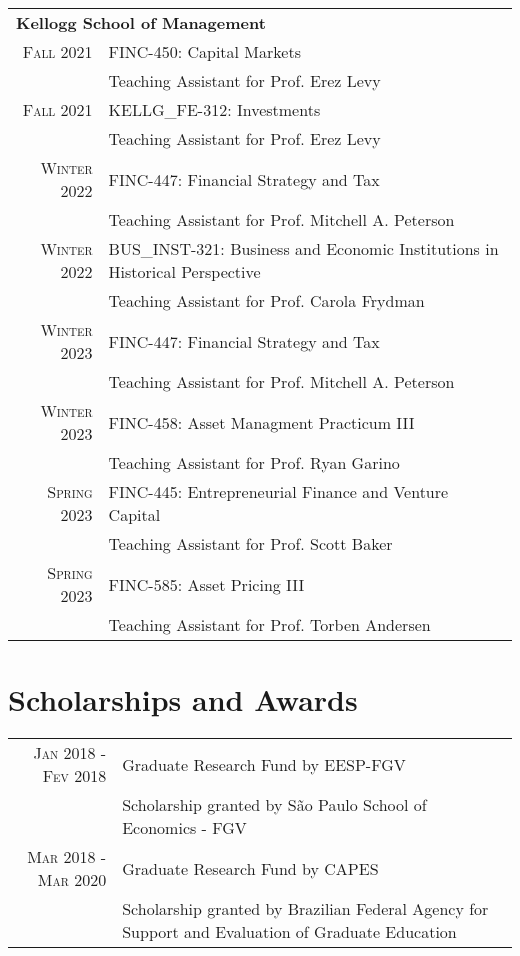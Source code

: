 \documentclass[a4paper,10pt]{article}
\begin{document}
\begin{tabular}{r|p{10.5cm}}
    \multicolumn{2}{l}{\large\textbf{Kellogg School of Management}} \\
    \textsc{Fall} 2021 & FINC-450: Capital Markets \\
    & \footnotesize{Teaching Assistant for Prof. Erez Levy} \\
    \textsc{Fall} 2021 & KELLG\_FE-312: Investments \\
    & \footnotesize{Teaching Assistant for Prof. Erez Levy} \\
    \textsc{Winter} 2022 & FINC-447: Financial Strategy and Tax \\
    & \footnotesize{Teaching Assistant for Prof. Mitchell A. Peterson} \\
    \textsc{Winter} 2022 & BUS\_INST-321: Business and Economic Institutions in Historical Perspective \\
    & \footnotesize{Teaching Assistant for Prof. Carola Frydman} \\
    \textsc{Winter} 2023 & FINC-447: Financial Strategy and Tax \\
    & \footnotesize{Teaching Assistant for Prof. Mitchell A. Peterson} \\
    \textsc{Winter} 2023 & FINC-458: Asset Managment Practicum III \\
    & \footnotesize{Teaching Assistant for Prof. Ryan Garino} \\
    \textsc{Spring} 2023 & FINC-445: Entrepreneurial Finance and Venture Capital \\
    & \footnotesize{Teaching Assistant for Prof. Scott Baker} \\
    \textsc{Spring} 2023 & FINC-585: Asset Pricing III \\
    & \footnotesize{Teaching Assistant for Prof. Torben Andersen} \\
\end{tabular}

\section{Scholarships and Awards}
\begin{tabular}{r|p{10.5cm}}
    \textsc{Jan} 2018 - \textsc{Fev} 2018 & Graduate Research Fund by EESP-FGV\\
    &\footnotesize{Scholarship granted by São Paulo School of Economics - FGV}
    \\
    \textsc{Mar} 2018 - \textsc{Mar} 2020 & Graduate Research Fund by CAPES\\
    &\footnotesize{Scholarship granted by Brazilian Federal Agency for Support and Evaluation of Graduate Education}
\end{tabular}
\end{document}
